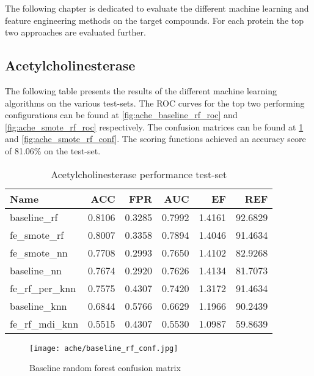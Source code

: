 \label{cha:performance_protein}
The following chapter is dedicated to evaluate the different machine learning and feature engineering methods on
the target compounds. For each protein the top two approaches are evaluated further.

\subsection{Acetylcholinesterase}
The following table presents the results of the different machine learning algorithms on the various
test-sets. The ROC curves for the top two performing configurations can be found at \ref{fig:ache_baseline_rf_roc} and \ref{fig:ache_smote_rf_roc}
respectively. The confusion matrices can be found at \ref{fig:ache_baseline_rf_conf} and \ref{fig:ache_smote_rf_conf}.
The scoring functions achieved an accuracy score of 81.06\% on the test-set.
\begin{table}[H]
    \begin{center}
        \caption{Acetylcholinesterase performance test-set}
        \begin{tabular}{lrrrrr}
            \toprule
            Name             & ACC    & FPR    & AUC    & EF     & REF     \\
            \midrule
            baseline\_rf     & 0.8106 & 0.3285 & 0.7992 & 1.4161 & 92.6829 \\
            fe\_smote\_rf    & 0.8007 & 0.3358 & 0.7894 & 1.4046 & 91.4634 \\
            fe\_smote\_nn    & 0.7708 & 0.2993 & 0.7650 & 1.4102 & 82.9268 \\
            baseline\_nn     & 0.7674 & 0.2920 & 0.7626 & 1.4134 & 81.7073 \\
            fe\_rf\_per\_knn & 0.7575 & 0.4307 & 0.7420 & 1.3172 & 91.4634 \\
            baseline\_knn    & 0.6844 & 0.5766 & 0.6629 & 1.1966 & 90.2439 \\
            fe\_rf\_mdi\_knn & 0.5515 & 0.4307 & 0.5530 & 1.0987 & 59.8639 \\
            \bottomrule
        \end{tabular}
    \end{center}
\end{table}

\begin{figure}[H]
    \begin{center}
        \caption[]{Baseline random forest confusion matrix}
        \label{fig:ache_baseline_rf_conf}
        \texttt{[image: ache/baseline\_rf\_conf.jpg]}
    \end{center}
\end{figure}

